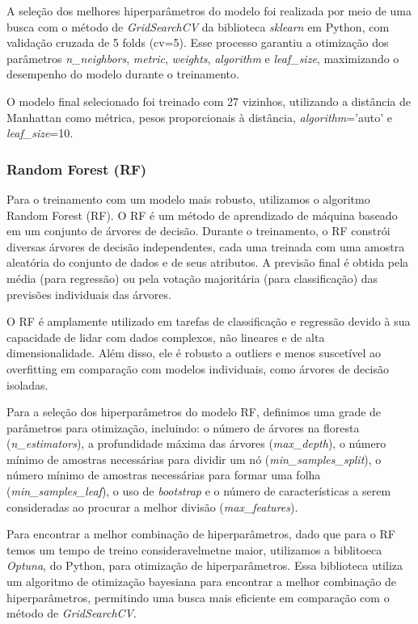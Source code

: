 A seleção dos melhores hiperparâmetros do modelo foi realizada por meio de uma busca com o método de \textit{GridSearchCV} da biblioteca \textit{sklearn} em Python, com validação cruzada de 5 folds (cv=5). Esse processo garantiu a otimização dos parâmetros \textit{n\_neighbors}, \textit{metric}, \textit{weights}, \textit{algorithm} e \textit{leaf\_size}, maximizando o desempenho do modelo durante o treinamento.

O modelo final selecionado foi treinado com 27 vizinhos, utilizando a distância de Manhattan como métrica, pesos proporcionais à distância, \textit{algorithm}='auto' e \textit{leaf\_size}=10.

\subsubsection*{Random Forest (RF)}\label{subsubsec:rf}
Para o treinamento com um modelo mais robusto, utilizamos o algoritmo Random Forest (RF). O \ac{RF} é um método de aprendizado de máquina baseado em um conjunto de árvores de decisão. Durante o treinamento, o \ac{RF} constrói diversas árvores de decisão independentes, cada uma treinada com uma amostra aleatória do conjunto de dados e de seus atributos. A previsão final é obtida pela média (para regressão) ou pela votação majoritária (para classificação) das previsões individuais das árvores.

O RF é amplamente utilizado em tarefas de classificação e regressão devido à sua capacidade de lidar com dados complexos, não lineares e de alta dimensionalidade. Além disso, ele é robusto a outliers e menos suscetível ao overfitting em comparação com modelos individuais, como árvores de decisão isoladas.

Para a seleção dos hiperparâmetros do modelo RF, definimos uma grade de parâmetros para otimização, incluindo: o número de árvores na floresta (\textit{n\_estimators}), a profundidade máxima das árvores (\textit{max\_depth}), o número mínimo de amostras necessárias para dividir um nó (\textit{min\_samples\_split}), o número mínimo de amostras necessárias para formar uma folha (\textit{min\_samples\_leaf}), o uso de \textit{bootstrap} e o número de características a serem consideradas ao procurar a melhor divisão (\textit{max\_features}).

Para encontrar a melhor combinação de hiperparâmetros, dado que para o RF temos um tempo de treino consideravelmetne maior, utilizamos a biblitoeca \textit{Optuna}, do Python, para otimização de hiperparâmetros. Essa biblioteca utiliza um algoritmo de otimização bayesiana para encontrar a melhor combinação de hiperparâmetros, permitindo uma busca mais eficiente em comparação com o método de \textit{GridSearchCV}.

